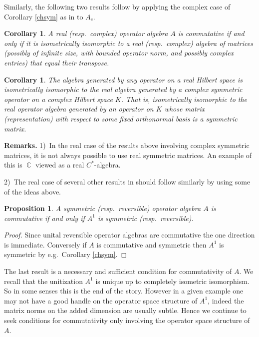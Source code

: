 \documentclass{amsart}
\newtheorem{corollary}[theorem]{Corollary}
\newtheorem{proposition}[theorem]{Proposition}
\theoremstyle{remark}
\theoremstyle{definition}
\numberwithin{equation}{section}
\DeclareMathOperator{\bC}{{\mathbb C}}
\begin{document}
Similarly, the following two results follow by applying the complex case 
of  Corollary \ref{chsym}  as in 
\cite{BWinv} to $A_c$.
  
 \begin{corollary} \label{chsym2}  A  real  (resp.\ complex)  operator algebra $A$  is commutative
if and only if it is isometrically isomorphic to a real  (resp.\ complex)  algebra of  matrices 
(possibly of infinite size, with 
bounded operator norm, and possibly complex 
entries)  that equal their transpose.
\end{corollary}
 
 \begin{corollary} \label{chsym3}  The algebra generated by any operator on a real Hilbert space is
 isometrically isomorphic to the real algebra generated by a complex symmetric operator 
on a complex Hilbert space $K$. That is,  isometrically isomorphic to the real operator algebra generated by an operator on $K$ whose matrix (representation) with respect to some fixed orthonormal basis is a 
symmetric matrix. 
\end{corollary}


{\bf Remarks.} 1)\ In the real case of the results above involving complex symmetric matrices, it is not always possible to use real symmetric matrices.
An example of this is $\bC$ viewed as a real $C^*$-algebra. 

\smallskip

2)\ The real case of several other results in \cite{BWinv} should follow similarly by
using some of the ideas above.    


\begin{proposition} \label{wiff} A  symmetric  (resp.\ reversible) operator algebra $A$ is commutative  if and only if $A^1$ is symmetric  (resp.\ reversible).  \end{proposition}  

  \begin{proof}  Since unital reversible operator algebras are commutative the one direction is immediate. 
  Conversely if $A$ is commutative  and symmetric then $A^1$ is  symmetric  by e.g.\ Corollary \ref{chsym}. \end{proof} 

The last result is a necessary and sufficient condition for commutativity of $A$.  We recall that
the unitization $A^1$ is unique up to 
        completely isometric isomorphism.   So in some senses this is the end of the story.
However 
in a given example one may not have a good handle on the operator space structure of $A^1$, indeed the matrix norms 
on the added dimension are usually subtle.  Hence we continue to seek conditions for commutativity only involving the 
operator space structure of $A$. 
\end{document}
